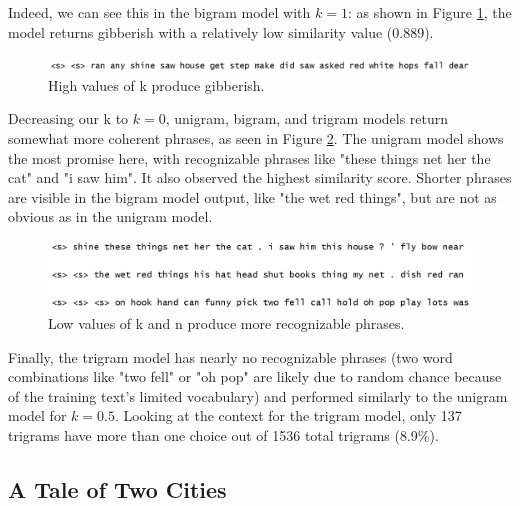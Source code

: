 \documentclass[11pt]{article}
\begin{document}
Indeed, we can see this in the bigram model with $k=1$: as shown in Figure \ref{fig:gibberish}, the model returns gibberish with a relatively low similarity value (0.889).

\begin{figure}[ht!]
    \centering
    \includegraphics[width=1\textwidth]{gibberish.png}
    \caption{High values of k produce gibberish.}
    \label{fig:gibberish}
\end{figure}

Decreasing our k to $k=0$, unigram, bigram, and trigram models return somewhat more coherent phrases, as seen in Figure \ref{fig:trio}.  The unigram model shows the most promise here, with recognizable phrases like "these things net her the cat" and "i saw him".  It also observed the highest similarity score.  Shorter phrases are visible in the bigram model output, like "the wet red things", but are not as obvious as in the unigram model.

\begin{figure}[ht!]
    \centering
    \includegraphics[width=1\textwidth]{trio.png}
    \caption{Low values of k and n produce more recognizable phrases.}
    \label{fig:trio}
\end{figure}

Finally, the trigram model has nearly no recognizable phrases (two word combinations like "two fell" or "oh pop" are likely due to random chance because of the training text's limited vocabulary) and performed similarly to the unigram model for $k=0.5$.  Looking at the context for the trigram model, only 137 trigrams have more than one choice out of 1536 total trigrams (8.9\%).

\subsection{A Tale of Two Cities}
\end{document}
